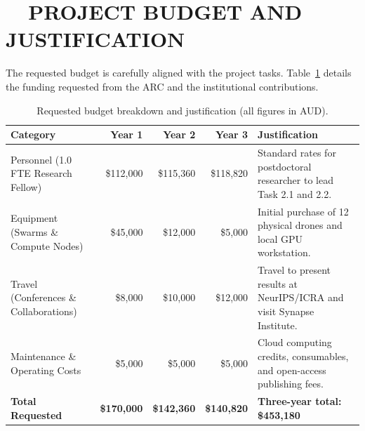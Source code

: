 \section{\texorpdfstring{\faCoins\ \ }{ }PROJECT BUDGET AND JUSTIFICATION}
The requested budget is carefully aligned with the project tasks. Table~\ref{tab:budget} details the funding requested from the ARC and the institutional contributions.

\begin{table}[htbp]
    \centering
    \small
    \caption{Requested budget breakdown and justification (all figures in AUD).}
    \label{tab:budget}
    \begin{tabularx}{\textwidth}{l r r r X}
        \toprule
        \textbf{Category} & \textbf{Year 1} & \textbf{Year 2} & \textbf{Year 3} & \textbf{Justification} \\
        \midrule
        Personnel (1.0 FTE Research Fellow) & \$112,000 & \$115,360 & \$118,820 & Standard rates for postdoctoral researcher to lead Task 2.1 and 2.2. \\
        Equipment (Swarms \& Compute Nodes) & \$45,000 & \$12,000 & \$5,000 & Initial purchase of 12 physical drones and local GPU workstation. \\
        Travel (Conferences \& Collaborations) & \$8,000 & \$10,000 & \$12,000 & Travel to present results at NeurIPS/ICRA and visit Synapse Institute. \\
        Maintenance \& Operating Costs & \$5,000 & \$5,000 & \$5,000 & Cloud computing credits, consumables, and open-access publishing fees. \\
        \midrule
        \textbf{Total Requested} & \textbf{\$170,000} & \textbf{\$142,360} & \textbf{\$140,820} & \textbf{Three-year total: \$453,180} \\
        \bottomrule
    \end{tabularx}
\end{table}
